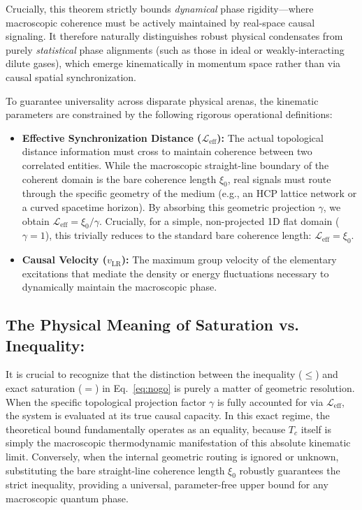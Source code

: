 \documentclass[11pt,a4paper]{article}
\begin{document}
Crucially, this theorem strictly bounds \textit{dynamical} phase rigidity—where macroscopic coherence must be actively maintained by real-space causal signaling. It therefore naturally distinguishes robust physical condensates from purely \textit{statistical} phase alignments (such as those in ideal or weakly-interacting dilute gases), which emerge kinematically in momentum space rather than via causal spatial synchronization.

To guarantee universality across disparate physical arenas, the kinematic parameters are constrained by the following rigorous operational definitions:
\begin{itemize}
    \item \textbf{Effective Synchronization Distance ($\mathcal{L}_{\text{eff}}$):} The actual topological distance information must cross to maintain coherence between two correlated entities. While the macroscopic straight-line boundary of the coherent domain is the bare coherence length $\xi_0$, real signals must route through the specific geometry of the medium (e.g., an HCP lattice network or a curved spacetime horizon). By absorbing this geometric projection $\gamma$, we obtain $\mathcal{L}_{\text{eff}} = \xi_0 / \gamma$. Crucially, for a simple, non-projected 1D flat domain ($\gamma=1$), this trivially reduces to the standard bare coherence length: $\mathcal{L}_{\text{eff}} = \xi_0$.
    \item \textbf{Causal Velocity ($v_{\text{LR}}$):} The maximum group velocity of the elementary excitations that mediate the density or energy fluctuations necessary to dynamically maintain the macroscopic phase.
\end{itemize}
\subsection*{The Physical Meaning of Saturation vs. Inequality:}
It is crucial to recognize that the distinction between the inequality ($\le$) and exact saturation ($=$) in Eq.~\eqref{eq:nogo} is purely a matter of geometric resolution. When the specific topological projection factor $\gamma$ is fully accounted for via $\mathcal{L}_{\text{eff}}$, the system is evaluated at its true causal capacity. In this exact regime, the theoretical bound fundamentally operates as an equality, because $T_c$ itself is simply the macroscopic thermodynamic manifestation of this absolute kinematic limit. Conversely, when the internal geometric routing is ignored or unknown, substituting the bare straight-line coherence length $\xi_0$ robustly guarantees the strict inequality, providing a universal, parameter-free upper bound for any macroscopic quantum phase.
\end{document}
